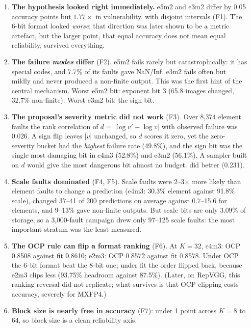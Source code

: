 \begin{enumerate}
\item \textbf{The hypothesis looked right immediately.} e5m2 and e3m2 differ by 0.05 accuracy points but $1.77\times$ in vulnerability, with disjoint intervals (F1). The 6-bit format looked \emph{worse}; that direction was later shown to be a metric artefact, but the larger point, that equal accuracy does not mean equal reliability, survived everything.
\item \textbf{The failure \emph{modes} differ} (F2). e5m2 fails rarely but catastrophically: it has special codes, and 7.7\% of its faults gave NaN/Inf. e3m2 fails often but mildly and never produced a non-finite output. This was the first hint of the central mechanism. Worst e5m2 bit: exponent bit 3 (65.8 images changed, 32.7\% non-finite). Worst e3m2 bit: the sign bit.
\item \textbf{The proposal's severity metric did not work} (F3). Over 8{,}374 element faults the rank correlation of $d=|\log v'-\log v|$ with observed failure was $0.026$. A sign flip leaves $|v|$ unchanged, so $d$ scores it zero, yet the zero-severity bucket had the \emph{highest} failure rate (49.8\%), and the sign bit was the single most damaging bit in e4m3 (52.8\%) and e3m2 (56.1\%).
 A sampler built on $d$ would give the most dangerous bit almost no budget.  did better (0.231).
\item \textbf{Scale faults dominated} (F4, F5). Scale faults were 2--3$\times$ more likely than element faults to change a prediction (e4m3: 30.3\% element against 91.8\% scale), changed 37--41 of 200 predictions on average against 0.7--15.6 for elements, and 9--13\% gave non-finite outputs. But scale bits are only 3.09\% of storage, so a 3{,}000-fault campaign drew only 97--125 scale faults: the most important stratum was the least measured.
\item \textbf{The OCP rule can flip a format ranking} (F6). At $K=32$, e4m3: OCP 0.8508 against fit 0.8610; e2m3: OCP 0.8572 against fit 0.8578. Under OCP the 6-bit format beat the 8-bit one; under fit the order flipped back, because e2m3 clips less (93.75\% headroom against 87.5\%). (Later, on RepVGG, this ranking reversal did not replicate; what survives is that OCP clipping costs accuracy, severely for MXFP4.)
\item \textbf{Block size is nearly free in accuracy} (F7): under 1 point across $K=8$ to 64, so block size is a clean reliability axis.
\end{enumerate}

